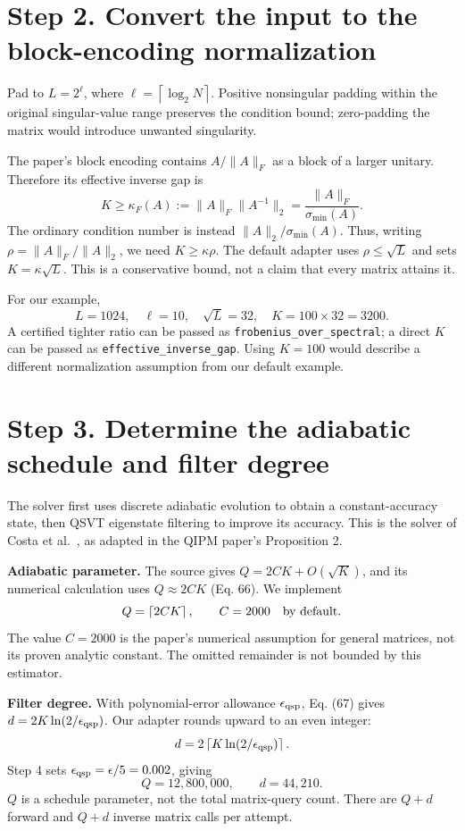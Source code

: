 \documentclass[11pt]{article}
\newcommand{\norm}[1]{\lVert#1\rVert}
\newcommand{\ceil}[1]{\left\lceil#1\right\rceil}
\begin{document}
\newpage
\section*{Step 2. Convert the input to the block-encoding normalization}
Pad to $L=2^\ell$, where $\ell=\ceil{\log_2N}$. Positive nonsingular padding within the original singular-value range preserves the condition bound; zero-padding the matrix would introduce unwanted singularity.

The paper's block encoding contains $A/\norm A_F$ as a block of a larger unitary. Therefore its effective inverse gap is
\begin{equation}\label{eq:K}
 K\ge\kappa_F(A):=\norm A_F\norm{A^{-1}}_2
   =\frac{\norm A_F}{\sigma_{\min}(A)}.
\end{equation}
The ordinary condition number is instead $\norm A_2/\sigma_{\min}(A)$. Thus, writing $\rho=\norm A_F/\norm A_2$, we need $K\ge\kappa\rho$. The default adapter uses $\rho\le\sqrt L$ and sets $K=\kappa\sqrt L$. This is a conservative bound, not a claim that every matrix attains it.

For our example,
\[
 L=1024,\quad\ell=10,\quad\sqrt L=32,\quad K=100\times32=3200.
\]
A certified tighter ratio can be passed as \texttt{frobenius\_over\_spectral}; a direct $K$ can be passed as \texttt{effective\_inverse\_gap}. Using $K=100$ would describe a different normalization assumption from our default example.

\section*{Step 3. Determine the adiabatic schedule and filter degree}
The solver first uses discrete adiabatic evolution to obtain a constant-accuracy state, then QSVT eigenstate filtering to improve its accuracy. This is the solver of Costa et al.~\cite{costa}, as adapted in the QIPM paper's Proposition 2.

\textbf{Adiabatic parameter.} The source gives $Q=2CK+O(\sqrt K)$, and its numerical calculation uses $Q\approx2CK$ (Eq. 66). We implement
\begin{equation}
 Q=\ceil{2CK},\qquad C=2000\quad\hbox{by default}.
\end{equation}
The value $C=2000$ is the paper's numerical assumption for general matrices, not its proven analytic constant. The omitted remainder is not bounded by this estimator.

\textbf{Filter degree.} With polynomial-error allowance $\epsilon_{\rm qsp}$, Eq. (67) gives $d=2K\ln(2/\epsilon_{\rm qsp})$. Our adapter rounds upward to an even integer:
\begin{equation}
 d=2\ceil{K\ln(2/\epsilon_{\rm qsp})}.
\end{equation}
Step 4 sets $\epsilon_{\rm qsp}=\epsilon/5=0.002$, giving
\[
 \boxed{Q=12{,}800{,}000,\qquad d=44{,}210.}
\]
$Q$ is a schedule parameter, not the total matrix-query count. There are $Q+d$ forward and $Q+d$ inverse matrix calls per attempt.
\end{document}
